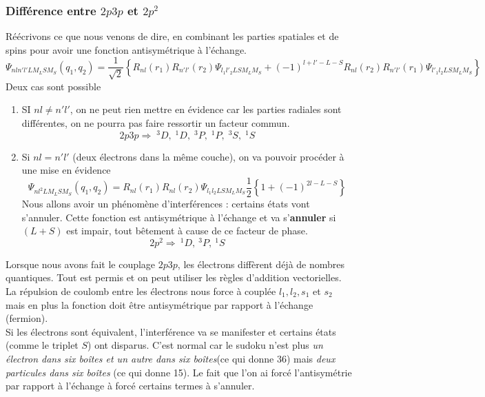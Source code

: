\subsubsection{Différence entre $2p3p$ et $2p^2$}
Réécrivons ce que nous venons de dire, en combinant les parties spatiales et de spins pour avoir
une fonction antisymétrique à l'échange. 
\begin{equation}
\Psi_{nl n'l' LM_LSM_S}(q_1,q_2) =\frac{1}{\sqrt{2}} 
\left\{ 
R_{nl}(r_1) R_{n'l'}(r_2)
 \Psi_{l_1 l'_2  LSM_LM_S} 
+ (-1)^{l+l'-L-S} 
R_{nl}(r_2) R_{n'l'}(r_1)
 \Psi_{l'_1 l_2 LSM_LM_S}  \right\}
\end{equation}
Deux cas sont possible
\begin{enumerate}
\item SI $nl\neq n'l'$, on ne peut rien mettre en évidence car les parties radiales sont différentes,
on ne pourra pas faire ressortir un facteur commun. 
\begin{equation}
2p3p\Rightarrow \; ^3D, \; ^1D, \; ^3P, \; ^1P, \; ^3S, \; ^1S
\end{equation}
\item Si $nl=n'l'$ (deux électrons dans la même couche), on va pouvoir procéder à une mise en 
évidence
\begin{equation}
\Psi_{nl^2 LM_LSM_S}(q_1,q_2) = R_{nl}(r_1) R_{nl}(r_2)
 \Psi_{l_1 l_2 LSM_LM_S} 
\frac{1}{2} 
\left\{ 1 
+ (-1)^{2l-L-S}\right\}
\end{equation}
Nous allons avoir un phénomène d'interférences : certains états vont s'annuler. Cette fonction 
est antisymétrique à l'échange et va s'\textbf{annuler} si $(L+S)$ est impair, tout bêtement à 
cause de ce facteur de phase.
\begin{equation}
2p^2 \Rightarrow\ ^1D,\ ^3P,\ ^1S
\end{equation}
\end{enumerate}

Lorsque nous avons fait le couplage $2p3p$, les électrons diffèrent déjà de nombres quantiques. Tout
est permis et on peut utiliser les règles d'addition vectorielles. La répulsion de coulomb entre les 
électrons nous force à couplée $l_1,l_2,s_1$ et $s_2$ mais en plus la fonction doit être 
antisymétrique par rapport à l'échange (fermion).\\

Si les électrons sont équivalent, l'interférence va se manifester et certains états (comme le 
triplet $S$) ont disparus. C'est normal car le sudoku n'est plus \textit{un électron dans six 
boîtes et un autre dans six boîtes}(ce qui donne 36) mais \textit{deux particules dans six
boîtes} (ce qui donne 15). Le fait que l'on ai forcé l'antisymétrie par rapport à l'échange à 
forcé certains termes à s'annuler.


